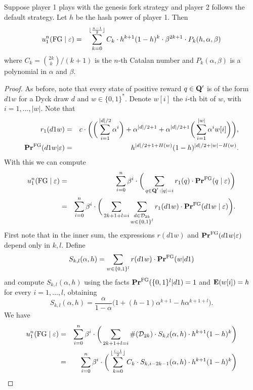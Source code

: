 \begin{myprop*}
Suppose player 1 plays with the genesis fork strategy and player 2 follows the default strategy. Let $h$ be the hash power of player 1. Then
\begin{eqnarray*}
	u_1^n(\text{\rm FG} \mid \varepsilon) & = & \sum_{k=0}^{\lfloor\frac{n-1}{2}\rfloor}C_k \cdot h^{k+1}(1-h)^{k}\cdot \beta^{2k+1}\cdot P_k(h,\alpha,\beta)
\end{eqnarray*}
where $C_k={2k\choose k}/(k+1)$ is the $n$-th Catalan number and $P_{k}(\alpha,\beta)$ is a polynomial in $\alpha$ and $\beta$.
\end{myprop*}
\begin{proof} As before, note that every state of positive reward $q\in\mathbf{Q}'$ is of the form $d1w$ for a Dyck draw $d$ and $w\in \{0,1\}^\ast$. Denote $w[i]$ the $i$-th bit of $w$, with $i=1,\dots,|w|$. Note that
\begin{eqnarray*}
r_1(d1w) &=& c\cdot \bigg(\bigg(\sum_{i=1}^{|d|/2}\alpha^i \bigg)+\alpha^{|d|/2+1}+\alpha^{|d|/2+1}\bigg(\sum_{i=1}^{|w|}\alpha^i w[i]\bigg)\bigg),\\
\mathbf{Pr}^{\text{\rm FG}}(d1w|\varepsilon) &=& h^{|d|/2+1+H(w)}(1-h)^{|d|/2+|w|-H(w)}.
\end{eqnarray*} 
With this we can compute 
\begin{eqnarray*}
	u_1^n(\text{\rm FG} \mid \varepsilon) & = & \sum_{i=0}^{n}\beta^{i} \cdot  \bigg(\sum_{\substack{q \in \mathbf{Q}' \,: |q| = i}} r_1(q) \cdot 
	\mathbf{Pr}^{\text{\rm FG}}(q \mid \varepsilon)\bigg)\\
								& = &  \sum_{i=0}^{n}\beta^{i} \cdot  \bigg(\sum_{2k+1+l=i}\sum_{\substack{d\in \mathcal{D}_{2k}\\w\in\{0,1\}^l}} r_1(d1w) \cdot 
	\mathbf{Pr}^{\text{\rm FG}}(d1w \mid \varepsilon)\bigg).
\end{eqnarray*}
First note that in the inner sum, the expressions $r(d1w)$ and $\mathbf{Pr}^{\text{\rm FG}}(d1w|\varepsilon)$ depend only in $k,l$. Define
$$S_{k,l}(\alpha,h)=\sum_{w\in\{0,1\}^l}r(d1w)\cdot \mathbf{Pr}^{\text{\rm FG}}(w|d1)$$
and compute $S_{k,l}(\alpha,h)$ using the facts $\mathbf{Pr}^{\text{\rm FG}}(\{0,1\}^l|d1)=1$ and $\mathbf{E}(w[i])=h$ for every $i=1,\dots,l$, obtaining 
$$S_{k,l}(\alpha,h)=\frac{\alpha}{1-\alpha}\bigg(1+(h-1)\alpha^{k+1}-h\alpha^{k+1+l}\bigg).$$
We have
\begin{eqnarray*}
u_1^n(\fg \mid \varepsilon) & = & \sum_{i=0}^{n}\beta^{i} \cdot  \bigg(\sum_{2k+1+l=i} \#(\Dyck_{2k})\cdot S_{k,l}(\alpha,h)\cdot h^{k+1}(1-h)^{k}\bigg)\\
							& = & \sum_{i=0}^{n}\beta^{i} \cdot  \bigg(\sum_{k=0}^{\lfloor\frac{i-1}{2}\rfloor} C_k\cdot S_{k,i-2k-1}(\alpha,h)\cdot h^{k+1}(1-h)^{k}\bigg)

\end{eqnarray*}
\end{proof}
